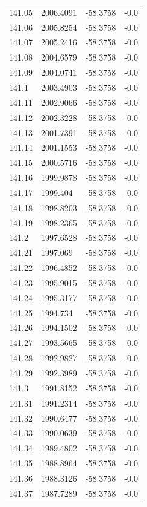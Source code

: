 \begin{table}[H]
\begin{tabular}{llll}
141.05 & 2006.4091 & -58.3758 & -0.0 \\
141.06 & 2005.8254 & -58.3758 & -0.0 \\
141.07 & 2005.2416 & -58.3758 & -0.0 \\
141.08 & 2004.6579 & -58.3758 & -0.0 \\
141.09 & 2004.0741 & -58.3758 & -0.0 \\
141.1 & 2003.4903 & -58.3758 & -0.0 \\
141.11 & 2002.9066 & -58.3758 & -0.0 \\
141.12 & 2002.3228 & -58.3758 & -0.0 \\
141.13 & 2001.7391 & -58.3758 & -0.0 \\
141.14 & 2001.1553 & -58.3758 & -0.0 \\
141.15 & 2000.5716 & -58.3758 & -0.0 \\
141.16 & 1999.9878 & -58.3758 & -0.0 \\
141.17 & 1999.404 & -58.3758 & -0.0 \\
141.18 & 1998.8203 & -58.3758 & -0.0 \\
141.19 & 1998.2365 & -58.3758 & -0.0 \\
141.2 & 1997.6528 & -58.3758 & -0.0 \\
141.21 & 1997.069 & -58.3758 & -0.0 \\
141.22 & 1996.4852 & -58.3758 & -0.0 \\
141.23 & 1995.9015 & -58.3758 & -0.0 \\
141.24 & 1995.3177 & -58.3758 & -0.0 \\
141.25 & 1994.734 & -58.3758 & -0.0 \\
141.26 & 1994.1502 & -58.3758 & -0.0 \\
141.27 & 1993.5665 & -58.3758 & -0.0 \\
141.28 & 1992.9827 & -58.3758 & -0.0 \\
141.29 & 1992.3989 & -58.3758 & -0.0 \\
141.3 & 1991.8152 & -58.3758 & -0.0 \\
141.31 & 1991.2314 & -58.3758 & -0.0 \\
141.32 & 1990.6477 & -58.3758 & -0.0 \\
141.33 & 1990.0639 & -58.3758 & -0.0 \\
141.34 & 1989.4802 & -58.3758 & -0.0 \\
141.35 & 1988.8964 & -58.3758 & -0.0 \\
141.36 & 1988.3126 & -58.3758 & -0.0 \\
141.37 & 1987.7289 & -58.3758 & -0.0 \\

\end{tabular}
\end{table}
